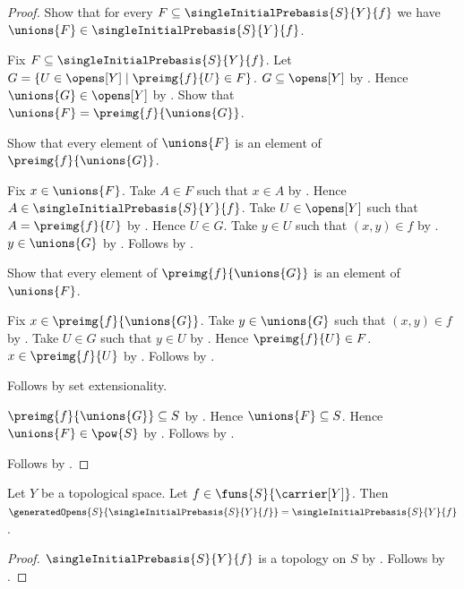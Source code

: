 \begin{proof}
    Show that for every $F\subseteq\singleInitialPrebasis{S}{Y}{f}$ we have
        $\unions{F}\in\singleInitialPrebasis{S}{Y}{f}$.
    \begin{subproof}
        Fix $F\subseteq\singleInitialPrebasis{S}{Y}{f}$.
        Let $G=\{U\in\opens[Y]\mid
            \preimg{f}{U}\in F\}$.
        $G\subseteq\opens[Y]$ by .
        Hence $\unions{G}\in\opens[Y]$ by .
        Show that $\unions{F}=\preimg{f}{\unions{G}}$.
        \begin{subproof}
            Show that every element of $\unions{F}$ is an element of
                $\preimg{f}{\unions{G}}$.
            \begin{subproof}
                Fix $x\in\unions{F}$.
                Take $A\in F$ such that $x\in A$ by .
                Hence $A\in\singleInitialPrebasis{S}{Y}{f}$.
                Take $U\in\opens[Y]$ such that $A=\preimg{f}{U}$ by
                    .
                Hence $U\in G$.
                Take $y\in U$ such that $(x,y)\in f$ by
                    .
                $y\in\unions{G}$ by .
                Follows by .
            \end{subproof}
            Show that every element of $\preimg{f}{\unions{G}}$ is an
                element of $\unions{F}$.
            \begin{subproof}
                Fix $x\in\preimg{f}{\unions{G}}$.
                Take $y\in\unions{G}$ such that $(x,y)\in f$ by
                    .
                Take $U\in G$ such that $y\in U$ by .
                Hence $\preimg{f}{U}\in F$.
                $x\in\preimg{f}{U}$ by .
                Follows by .
            \end{subproof}
            Follows by set extensionality.
        \end{subproof}
        $\preimg{f}{\unions{G}}\subseteq S$ by
            .
        Hence $\unions{F}\subseteq S$.
        Hence $\unions{F}\in\pow{S}$ by .
        Follows by
            .
    \end{subproof}
    Follows by .
\end{proof}

\begin{theorem}\label{single_initial_generated_opens}
    Let $Y$ be a topological space.
    Let $f\in\funs{S}{\carrier[Y]}$.
    Then $\generatedOpens{S}{\singleInitialPrebasis{S}{Y}{f}}
        =\singleInitialPrebasis{S}{Y}{f}$.
\end{theorem}
\begin{proof}
    $\singleInitialPrebasis{S}{Y}{f}$ is a topology on $S$ by
        .
    Follows by .
\end{proof}

